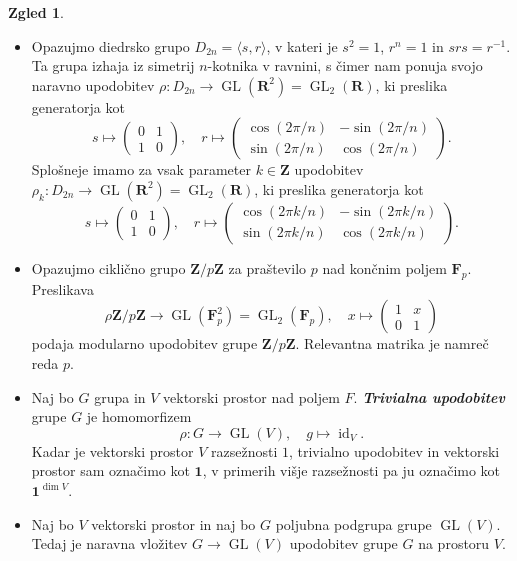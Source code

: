 \documentclass[11pt]{book}
\def\ZZ{\mathbf{Z}}
\def\RR{\mathbf{R}}
\def\11{\mathbf{1}}
\def\FF{\mathbf{F}}
\DeclareMathOperator\GL{GL}
\DeclareMathOperator\id{id}
\def\definicija{\color{rdeca}\bf\em}
\theoremstyle{definition}
\theoremstyle{zgled}
\newtheorem*{zgled}{Zgled}
\theoremstyle{odprtproblem}
\theoremstyle{domacanaloga}
\theoremstyle{izrek}
\begin{document}
\begin{zgled}
\begin{itemize}
        \item Opazujmo diedrsko grupo $D_{2n} = \langle s, r \rangle$, v kateri je $s^2 = 1$, $r^n = 1$ in $s r s = r^{-1}$. Ta grupa izhaja iz simetrij $n$-kotnika v ravnini, s čimer nam ponuja svojo naravno upodobitev $\rho \colon D_{2n} \to \GL(\RR^2) = \GL_2(\RR)$, ki preslika generatorja kot
        \[
            s \mapsto \begin{pmatrix}
                0 & 1 \\ 1 & 0
            \end{pmatrix}, \quad
            r \mapsto \begin{pmatrix}
                \cos(2 \pi/n) & - \sin(2 \pi/n) \\
                \sin(2 \pi/n) & \cos(2 \pi/n)
            \end{pmatrix}.
        \]
        Splošneje imamo za vsak parameter $k \in \ZZ$ upodobitev $\rho_k \colon D_{2n} \to \GL(\RR^2) = \GL_2(\RR)$, ki preslika generatorja kot
        \[
            s \mapsto \begin{pmatrix}
                0 & 1 \\ 1 & 0
            \end{pmatrix}, \quad
            r \mapsto \begin{pmatrix}
                \cos(2 \pi k/n) & - \sin(2 \pi k/n) \\
                \sin(2 \pi k/n) & \cos(2 \pi k/n)
            \end{pmatrix}.
        \]
        
        \item Opazujmo ciklično grupo $\ZZ/p\ZZ$ za praštevilo $p$ nad končnim poljem $\FF_p$. Preslikava
        \[
          \rho \ZZ/p\ZZ \to \GL(\FF_p^2) = {\textstyle \GL_2(\FF_p)}, \quad
          x \mapsto \begin{pmatrix}
            1 & x \\ 0 & 1
          \end{pmatrix}
        \]
        podaja modularno upodobitev grupe $\ZZ/p\ZZ$. Relevantna matrika je namreč reda $p$.

        \item Naj bo $G$ grupa in $V$ vektorski prostor nad poljem $F$. {\definicija Trivialna upodobitev} grupe $G$ je homomorfizem
        \[
            \rho \colon G \to \GL(V), \quad
            g \mapsto \textstyle \id_V.
        \]
        Kadar je vektorski prostor $V$ razsežnosti $1$, trivialno upodobitev in vektorski prostor sam označimo kot $\11$, v primerih višje razsežnosti pa ju označimo kot $\11^{\dim V}$.
        \item Naj bo $V$ vektorski prostor in naj bo $G$ poljubna podgrupa grupe $\GL(V)$. Tedaj je naravna vložitev $G \to \GL(V)$ upodobitev grupe $G$ na prostoru $V$. 
        

\end{itemize}
\end{zgled}
\end{document}
